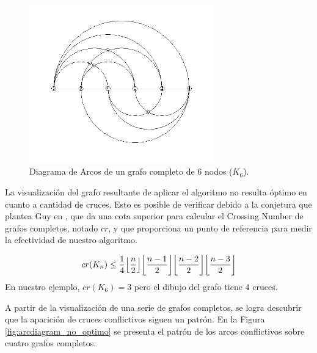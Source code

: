 	\begin{figure}[h]
		\centering
		\includegraphics[width=8cm]{imagenes/grafo_1_bn.png}
		\caption{Diagrama de Arcos de un grafo completo de 6 nodos ($K_6$).}
		\label{fig:arcdiagram_k6_no_optimo}
	\end{figure}
	
	La  visualización  del grafo resultante de aplicar el algoritmo no resulta óptimo en cuanto a cantidad de cruces. Esto es posible de verificar debido a la conjetura que  plantea Guy en \cite{guy1960combinatorial},  que  da una cota superior para calcular el Crossing Number de grafos completos, notado $cr$,  y que proporciona un punto de referencia para medir la efectividad de nuestro algoritmo.
	
	$$cr(K_n) \leq \frac{1}{4} \floor*{\frac{n}{2}} \floor*{\frac{n-1}{2}} \floor*{\frac{n-2}{2}} \floor*{\frac{n-3}{2}}$$
	En nuestro  ejemplo, $cr(K_6)=3$ pero el dibujo del grafo  tiene 4 cruces.
	
	
	A partir de la visualización de  una serie de grafos completos, se logra descubrir  que la aparición de cruces conflictivos  siguen un  patrón. En la Figura \ref{fig:arcdiagram_no_optimo} se presenta el patrón de los  arcos  conflictivos sobre cuatro grafos completos. 
	
	
